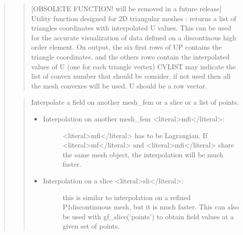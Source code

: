 \documentclass[a4paper,11pt,english]{sphinxmanual}
\begin{document}
\begin{quote}
\sphinxAtStartPar
{}
\begin{quote}

\sphinxAtStartPar
{[}OBSOLETE FUNCTION! will be removed in a future release{]}
Utility function designed for 2D triangular meshes : returns a list
of triangles coordinates with interpolated U values. This can be
used for the accurate visualization of data defined on a
discontinous high order element. On output, the six first rows of UP
contains the triangle coordinates, and the others rows contain the
interpolated values of U (one for each triangle vertex) CVLIST may
indicate the list of convex number that should be consider, if not
used then all the mesh convexes will be used. U should be a row
vector.
\end{quote}

\sphinxAtStartPar
{}
\begin{quote}

\sphinxAtStartPar
Interpolate a field on another mesh\_fem or a slice or a list of points.
\begin{itemize}
\item {} \begin{description}
\item[{Interpolation on another mesh\_fem \textless{}literal\textgreater{}mfi\textless{}/literal\textgreater{}:}] \leavevmode
\sphinxAtStartPar
\textless{}literal\textgreater{}mfi\textless{}/literal\textgreater{} has to be Lagrangian. If \textless{}literal\textgreater{}mf\textless{}/literal\textgreater{} and \textless{}literal\textgreater{}mfi\textless{}/literal\textgreater{} share the same
mesh object, the interpolation will be much faster.

\end{description}

\item {} \begin{description}
\item[{Interpolation on a slice \textless{}literal\textgreater{}sli\textless{}/literal\textgreater{}:}] \leavevmode
\sphinxAtStartPar
this is similar to interpolation on a refined P1\sphinxhyphen{}discontinuous
mesh, but it is much faster. This can also be used with
gf\_slice(‘points’) to obtain field values at a given set of
points.


\end{description}
\end{itemize}
\end{quote}
\end{quote}
\end{document}
